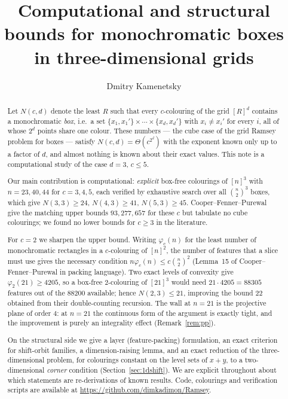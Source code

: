 \documentclass[11pt]{article}
\title{Computational and structural bounds for monochromatic boxes\\ in three-dimensional grids}
\author{Dmitry Kamenetsky}
\date{}
\theoremstyle{definition}
\begin{document}
\maketitle

\begin{abstract}
Let $N(c,d)$ denote the least $R$ such that every $c$-colouring of the grid $[R]^d$
contains a monochromatic \emph{box}, i.e.\ a set
$\{x_1,x_1'\}\times\cdots\times\{x_d,x_d'\}$ with $x_i\neq x_i'$ for every $i$, all of
whose $2^d$ points share one colour. These numbers --- the cube case of the grid Ramsey
problem for boxes --- satisfy $N(c,d)=\Theta(c^{2^d})$ with the exponent known only up to
a factor of $d$, and almost nothing is known about their exact values.
This note is a computational study of the case $d=3$, $c\le5$.

Our main contribution is computational: \emph{explicit} box-free colourings of $[n]^3$
with $n=23,40,44$ for $c=3,4,5$, each verified by exhaustive search over all
$\binom{n}{2}^3$ boxes, which give $N(3,3)\ge24$, $N(4,3)\ge41$, $N(5,3)\ge45$.
Cooper--Fenner--Purewal give the matching upper bounds $93,277,657$ for these $c$ but
tabulate no cube colourings; we found no lower bounds for $c\ge3$ in the literature.

For $c=2$ we sharpen the upper bound. Writing $\varphi_c(n)$ for the least number of
monochromatic rectangles in a $c$-colouring of $[n]^2$, the number of features that a
slice must use gives the necessary condition $n\varphi_c(n)\le c\binom{n}{2}^{2}$
(Lemma~15 of Cooper--Fenner--Purewal in packing language). Two exact levels of convexity
give $\varphi_2(21)\ge4205$, so a box-free $2$-colouring of $[21]^3$ would need
$21\cdot4205=88305$ features out of the $88200$ available; hence $N(2,3)\le21$,
improving the bound $22$ obtained from their double-counting recursion. The wall at
$n=21$ is the projective plane of order $4$: at $n=21$ the continuous form of the argument
is exactly tight, and the improvement is purely an integrality effect
(Remark~\ref{rem:pp}).

On the structural side we give a layer (feature-packing) formulation, an exact criterion
for shift-orbit families, a dimension-raising lemma, and an exact reduction of the
three-dimensional problem, for colourings constant on the level sets of $x+y$, to a
two-dimensional \emph{corner} condition (Section~\ref{sec:1dshift}). We are explicit
throughout about which statements are re-derivations of known results. Code, colourings
and verification scripts are available at
\url{https://github.com/dimkadimon/Ramsey}.
\end{abstract}
\end{document}
